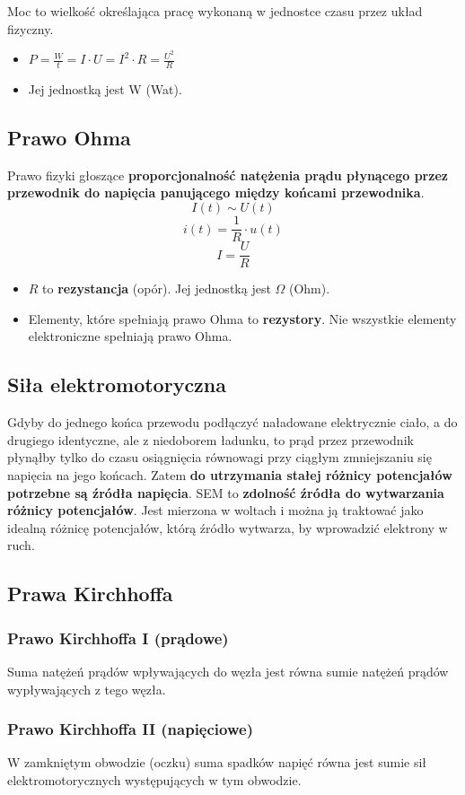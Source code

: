\documentclass{article}
\begin{document}
Moc to wielkość określająca pracę wykonaną w jednostce czasu przez układ fizyczny.
\begin{itemize}
    \item $P=\frac{W}{t} = I \cdot U = I^2 \cdot R = \frac{U^2}{R}$
    \item Jej jednostką jest W (Wat).
\end{itemize}

\subsection{Prawo Ohma}
Prawo fizyki głoszące \textbf{proporcjonalność natężenia prądu płynącego przez przewodnik do napięcia panującego między końcami przewodnika}.
$$I(t) \sim U(t)$$
$$i(t) = \frac{1}{R}\cdot u(t)$$
$$I=\frac{U}{R}$$

\begin{itemize}
    \item $R$ to \textbf{rezystancja} (opór). Jej jednostką jest $\Omega$ (Ohm).
    \item Elementy, które spełniają prawo Ohma to \textbf{rezystory}. Nie wszystkie elementy elektroniczne spełniają prawo Ohma.
\end{itemize}

\subsection{Siła elektromotoryczna}
Gdyby do jednego końca przewodu podłączyć naładowane elektrycznie ciało, a do drugiego identyczne, ale z niedoborem ładunku, to prąd przez przewodnik płynąłby tylko do czasu osiągnięcia równowagi przy ciągłym zmniejszaniu się napięcia na jego końcach. Zatem \textbf{do utrzymania stałej różnicy potencjałów potrzebne są źródła napięcia}. SEM to \textbf{zdolność źródła do wytwarzania różnicy potencjałów}. Jest mierzona w woltach i można ją traktować jako idealną różnicę potencjałów, którą źródło wytwarza, by wprowadzić elektrony w ruch.

\subsection{Prawa Kirchhoffa}
\subsubsection{Prawo Kirchhoffa I (prądowe)}
Suma natężeń prądów wpływających do węzła jest równa sumie natężeń prądów wypływających z tego węzła.
\subsubsection{Prawo Kirchhoffa II (napięciowe)}
W zamkniętym obwodzie (oczku) suma spadków napięć równa jest sumie sił elektromotorycznych występujących w tym obwodzie.
\end{document}
